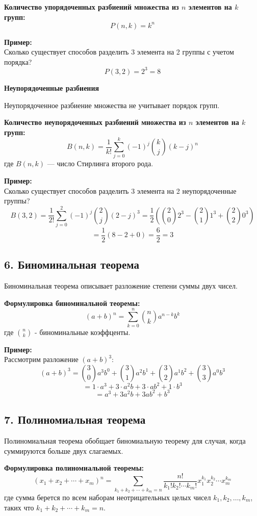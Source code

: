 \documentclass{article}
\begin{document}
\textbf{Количество упорядоченных разбиений множества из \( n \) элементов на \( k \) групп:}
\[
P(n, k) = k^n
\]

\textbf{Пример:} \\
Сколько существует способов разделить 3 элемента на 2 группы с учетом порядка?
\[
P(3, 2) = 2^3 = 8
\]

\textbf{Неупорядоченные разбиения}

Неупорядоченное разбиение множества не учитывает порядок групп.

\textbf{Количество неупорядоченных разбиений множества из \( n \) элементов на \( k \) групп:}
\[
B(n, k) = \frac{1}{k!} \sum_{j=0}^{k} (-1)^j \binom{k}{j} (k-j)^n
\]
где \( B(n, k) \) — число Стирлинга второго рода.

\textbf{Пример:} \\
Сколько существует способов разделить 3 элемента на 2 неупорядоченные группы?
\[
B(3, 2) = \frac{1}{2!} \sum_{j=0}^{2} (-1)^j \binom{2}{j} (2-j)^3 = \frac{1}{2} \left( \binom{2}{0} 2^3 - \binom{2}{1} 1^3 + \binom{2}{2} 0^3 \right)
\]
\[
= \frac{1}{2} (8 - 2 + 0) = \frac{6}{2} = 3
\]
\pagebreak

\subsection*{6. Биноминальная теорема}

Биноминальная теорема описывает разложение степени суммы двух чисел.

\textbf{Формулировка биноминальной теоремы:}
\[
(a+b)^n = \sum_{k=0}^{n} \binom{n}{k} a^{n-k} b^k
\]
где \(\binom{n}{k}\) - биноминальные коэффценты.

\textbf{Пример:} \\
Рассмотрим разложение \((a + b)^3\):
\[
(a + b)^3 = \binom{3}{0} a^3 b^0 + \binom{3}{1} a^2 b^1 + \binom{3}{2} a^1 b^2 + \binom{3}{3} a^0 b^3
\]
\[
= 1 \cdot a^3 + 3 \cdot a^2 b + 3 \cdot a b^2 + 1 \cdot b^3
\]
\[
= a^3 + 3a^2b + 3ab^2 + b^3
\]
\pagebreak

\subsection*{7. Полиномиальная теорема}

Полиномиальная теорема обобщает биномиальную теорему для случая, когда суммируются больше двух слагаемых. 

\textbf{Формулировка полиномиальной теоремы:}
\[
(x_1 + x_2 + \cdots + x_m)^n = \sum_{k_1 + k_2 + \cdots + k_m = n} \frac{n!}{k_1! k_2! \cdots k_m!} x_1^{k_1} x_2^{k_2} \cdots x_m^{k_m}
\]
где сумма берется по всем наборам неотрицательных целых чисел \( k_1, k_2, \ldots, k_m \), таких что \( k_1 + k_2 + \cdots + k_m = n \).
\end{document}

